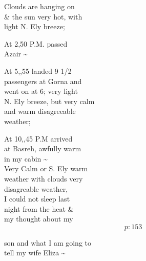\documentclass{report}
\begin{document}
	\par{
 	Clouds are hanging on\ \\\& the sun very hot, with\ \\light N. Ely breeze;\ \\
	}

	\par{
 	At 2,50 P.M. passed\ \\Azair \~{}\ \\
	}

	\par{
 	At 5,,55 landed 9 1/2\ \\passengers at Gorna and\ \\went on at 6; very light\ \\N. Ely breeze, but very calm\ \\and warm disagreeable\ \\weather;\ \\
	}

	\par{
 	At 10,,45 P.M arrived\ \\at Basreh, awfully warm\ \\in my cabin \~{}\ \\Very Calm or S. Ely warm\ \\weather with clouds very\ \\disagreable weather,\ \\I could not sleep last\ \\night from the heat \&\ \\my thought about my\ \\
  \[p: 153 \]

	}


	\par{
 	son and what I am going to\ \\tell my wife Eliza \~{}\ \\
	}
\end{document}
